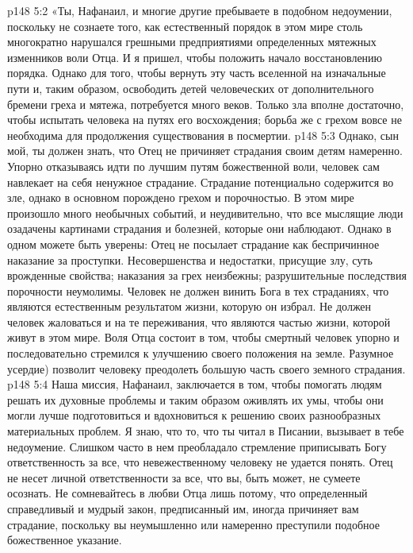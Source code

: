 \vs p148 5:2 \pc «Ты, Нафанаил, и многие другие пребываете в подобном недоумении, поскольку не сознаете того, как естественный порядок в этом мире столь многократно нарушался грешными предприятиями определенных мятежных изменников воли Отца. И я пришел, чтобы положить начало восстановлению порядка. Однако для того, чтобы вернуть эту часть вселенной на изначальные пути и, таким образом, освободить детей человеческих от дополнительного бремени греха и мятежа, потребуется много веков. Только зла вполне достаточно, чтобы испытать человека на путях его восхождения; борьба же с грехом вовсе не необходима для продолжения существования в посмертии.
\vs p148 5:3 Однако, сын мой, ты должен знать, что Отец не причиняет страдания своим детям намеренно. Упорно отказываясь идти по лучшим путям божественной воли, человек сам навлекает на себя ненужное страдание. Страдание потенциально содержится во зле, однако в основном порождено грехом и порочностью. В этом мире произошло много необычных событий, и неудивительно, что все мыслящие люди озадачены картинами страдания и болезней, которые они наблюдают. Однако в одном можете быть уверены: Отец не посылает страдание как беспричинное наказание за проступки. Несовершенства и недостатки, присущие злу, суть врожденные свойства; наказания за грех неизбежны; разрушительные последствия порочности неумолимы. Человек не должен винить Бога в тех страданиях, что являются естественным результатом жизни, которую он избрал. Не должен человек жаловаться и на те переживания, что являются частью жизни, которой живут в этом мире. Воля Отца состоит в том, чтобы смертный человек упорно и последовательно стремился к улучшению своего положения на земле. Разумное усердие) позволит человеку преодолеть большую часть своего земного страдания.
\vs p148 5:4 Наша миссия, Нафанаил, заключается в том, чтобы помогать людям решать их духовные проблемы и таким образом оживлять их умы, чтобы они могли лучше подготовиться и вдохновиться к решению своих разнообразных материальных проблем. Я знаю, что то, что ты читал в Писании, вызывает в тебе недоумение. Слишком часто в нем преобладало стремление приписывать Богу ответственность за все, что невежественному человеку не удается понять. Отец не несет личной ответственности за все, что вы, быть может, не сумеете осознать. Не сомневайтесь в любви Отца лишь потому, что определенный справедливый и мудрый закон, предписанный им, иногда причиняет вам страдание, поскольку вы неумышленно или намеренно преступили подобное божественное указание.
